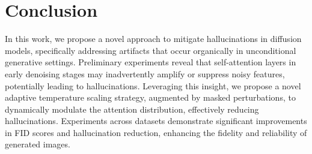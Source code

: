 \section{Conclusion}

In this work, we propose a novel approach to mitigate hallucinations in diffusion models, specifically addressing artifacts that occur organically in unconditional generative settings.
Preliminary experiments reveal that self-attention layers in early denoising stages may inadvertently amplify or suppress noisy features, potentially leading to hallucinations.
Leveraging this insight, we propose a novel adaptive temperature scaling strategy, augmented by masked perturbations, to dynamically modulate the attention distribution, effectively reducing hallucinations. 
Experiments across datasets demonstrate significant improvements in FID scores and hallucination reduction, enhancing the fidelity and reliability of generated images.
